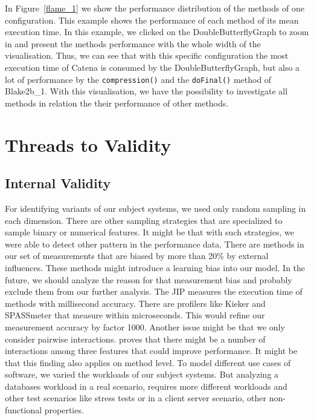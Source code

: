 In Figure~\ref{flame_1} we show the performance distribution of the methods of one configuration. This example shows the performance of each method of its mean execution time. In this example, we clicked on the DoubleButterflyGraph to zoom in and present the methods performance with the whole width of the visualisation. Thus, we can see that with this specific configuration the most execution time of Catena is consumed by the DoubleButterflyGraph, but also a lot of performance by the \texttt{compression()} and the \texttt{doFinal()} method of Blake2b\_1. With this visualisation, we have the possibility to investigate all methods in relation the their performance of other methods. 





\section{Threads to Validity}
\label{validity}


\subsection{Internal Validity}



For identifying variants of our subject systems, we used only random sampling in each dimension. There are other sampling strategies that are specialized to sample binary or numerical features. It might be that with such strategies, we were able to detect other pattern in the performance data. There are methods in our set of measurements that are biased by more than 20\% by external influences. These methods might introduce a learning bias into our model. In the future, we should analyze the reason for that measurement bias and probably exclude them from our further analysis. The \ac{JIP} measures the execution time of methods with millisecond accuracy. There are profilers like Kieker and SPASSmeter that measure within microseconds. This would refine our measurement accuracy by factor 1000. Another issue might be that we only consider pairwise interactions. \cite{siegmund2012predicting} proves that there might be a number of interactions among three features that could improve performance. It might be that this finding also applies on method level. To model different use cases of software, we varied the workloads of our subject systems. But analyzing a databases workload in a real scenario, requires more different workloads and other test scenarios like stress tests or in a client server scenario, other non-functional properties.


